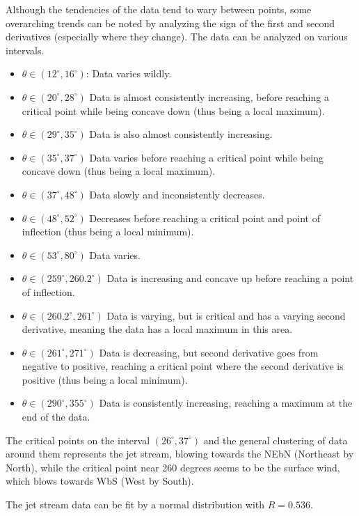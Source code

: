 \documentclass{article}
\begin{document}
Although the tendencies of the data tend to wary between points, some overarching trends can be noted by analyzing the sign of the first and second derivatives (especially where they change).
The data can be analyzed on various intervals.
\begin{itemize}
  \item $\theta \in (12^{\circ},16^{\circ})$: Data varies wildly.
  \item $\theta \in (20^{\circ}, 28^{\circ})$ Data is almost consistently increasing, before reaching a critical point while being concave down (thus being a local maximum).
  \item $\theta \in (29^{\circ}, 35^{\circ})$ Data is also almost consistently increasing.
  \item $\theta \in (35^{\circ}, 37^{\circ})$ Data varies before reaching a critical point while being concave down (thus being a local maximum).
  \item $\theta \in (37^{\circ}, 48^{\circ})$ Data slowly and inconsistently decreases.
  \item $\theta \in (48^{\circ}, 52^{\circ})$ Decreases before reaching a critical point and point of inflection (thus being a local minimum).
  \item $\theta \in (53^{\circ}, 80^{\circ})$ Data varies.
  \item $\theta \in (259^{\circ}, 260.2^{\circ})$ Data is increasing and concave up before reaching a point of inflection.
  \item $\theta \in (260.2^{\circ}, 261^{\circ})$ Data is varying, but is critical and has a varying second derivative, meaning the data has a local maximum in this area.
  \item $\theta \in (261^{\circ}, 271^{\circ})$ Data is decreasing, but second derivative goes from negative to positive, reaching a critical point where the second derivative is positive (thus being a local minimum).
  \item $\theta \in (290^{\circ}, 355^{\circ})$ Data is consistently increasing, reaching a maximum at the end of the data.
\end{itemize}

The critical points on the interval $(26^{\circ}, 37^{\circ})$ and the general clustering of data around them represents the jet stream, blowing towards the NEbN (Northeast by North), while the critical point near 260 degrees seems to be the surface wind, which blows towards WbS (West by South).

The jet stream data can be fit by a normal distribution with $R = 0.536$.
\end{document}
